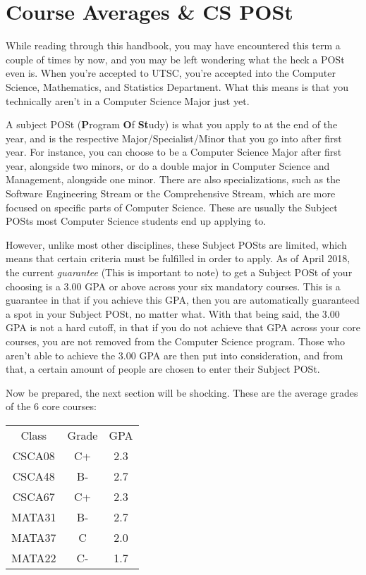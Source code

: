 \documentclass[11pt]{article}
\begin{document}
\section{Course Averages \& CS POSt}
While reading through this handbook, you may have encountered this term a couple of times by now, and you may be left wondering what the heck a POSt even is.  When you're accepted to UTSC, you're accepted into the Computer Science, Mathematics, and Statistics Department.  What this means is that you technically aren't in a Computer Science Major just yet.\par
A subject POSt (\textbf{P}rogram \textbf{O}f \textbf{St}udy) is what you apply to at the end of the year, and is the respective Major/Specialist/Minor that you go into after first year.  For instance, you can choose to be a Computer Science Major after first year, alongside two minors, or do a double major in Computer Science and Management, alongside one minor.  There are also specializations, such as the Software Engineering Stream or the Comprehensive Stream, which are more focused on specific parts of Computer Science. These are usually the Subject POSts most Computer Science students end up applying to.\par
However, unlike most other disciplines, these Subject POSts are limited, which means that certain criteria must be fulfilled in order to apply.  As of April 2018, the current \textit{guarantee} (This is important to note) to get a Subject POSt of your choosing is a 3.00 GPA or above across your six mandatory courses.  This is a guarantee in that if you achieve this GPA, then you are automatically guaranteed a spot in your Subject POSt, no matter what.  With that being said, the 3.00 GPA is not a hard cutoff, in that if you do not achieve that GPA across your core courses, you are not removed from the Computer Science program.  Those who aren't able to achieve the 3.00 GPA are then put into consideration, and from that, a certain amount of people are chosen to enter their Subject POSt.\par
Now be prepared, the next section will be shocking. These are the average grades of the 6 core courses:\par
\begin{center}
    \begin{tabular}{|c|c|c|}
    Class&Grade&GPA \\
     CSCA08&C+&2.3\\
     CSCA48&B-&2.7\\
     CSCA67&C+&2.3\\
     MATA31&B-&2.7\\
     MATA37&C&2.0\\
     MATA22&C-&1.7 
    \end{tabular}
\end{center}
\end{document}
